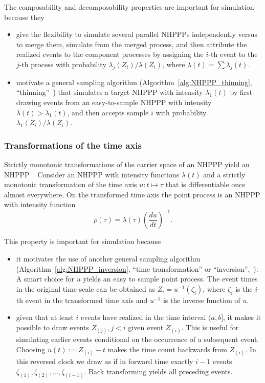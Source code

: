 \documentclass[article]{jss}\usepackage[]{graphicx}\usepackage[]{xcolor}
\newcommand{\der}[2]{\frac{d {#1}} {d{#2}}}
\begin{document}
The composability and decomposability properties are important for simulation because they
\begin{itemize}
    \item give the flexibility to simulate several parallel NHPPPs independently versus to merge them, simulate from the merged process, and then attribute the realized events to the component processes by assigning the $i$-th event to the $j$-th process with probability $\lambda_j(Z_i) / \lambda(Z_i)$, where $\lambda(t) = \sum \lambda_j(t)$.
    \item motivate a general sampling algorithm (Algorithm~\ref{alg:NHPPP_thinning}, ``thinning''~\citep{lewis1979thinning}) that simulates a target NHPPP with intensity $\lambda_1(t)$ by first drawing events from an easy-to-sample NHPPP with intensity $\lambda(t) >\lambda_1(t)$, and then accepts sample $i$ with probability $\lambda_1(Z_i)/\lambda(Z_i)$.
\end{itemize}

\subsubsection{Transformations of the time axis}
Strictly monotonic transformations of the carrier space of an NHPPP yield an NHPPP~\citep[]{Cinlar1975inversion}. Consider an NHPPP with intensity functions $\lambda(t)$ and a strictly monotonic transformation of the time axis $u: t \mapsto \tau$ that is differentiable once almost everywhere. On the transformed time axis the point process is an NHPPP with intensity function
\begin{equation}\label{eq:transform}
    \rho(\tau) = \lambda(\tau) \left ( \der{u}{t} \right )^{-1}.
\end{equation}

This property is important for simulation because
\begin{itemize}
    \item it motivates the use of another general sampling algorithm (Algorithm~\ref{alg:NHPPP_inversion}, ``time transformation'' or ``inversion'',~\citet{Cinlar1975inversion}): A smart choice for $u$ yields an easy to sample point process. The event times in the original time scale can be obtained as $Z_i = u^{-1}(\zeta_i)$, where $\zeta_i$ is the $i$-th event in the transformed time axis and $u^{-1}$ is the inverse function of $u$.
    \item given that at least $i$ events have realized in the time interval $(a, b]$, it makes it possible to draw events ${Z_{(j)}, j<i}$ given event $Z_{(i)}$. This is useful for simulating earlier events conditional on the occurrence of a subsequent event. Choosing $u(t) := Z_{(i)} - t$ makes the time count backwards from $Z_{(i)}$. In this reversed clock we draw as if in forward time exactly $i-1$ events $\zeta_{(1)}, \zeta_{(2)}, \dots, \zeta_{(i-1)}$. Back transforming yields all preceding events.
\end{itemize}
\end{document}
